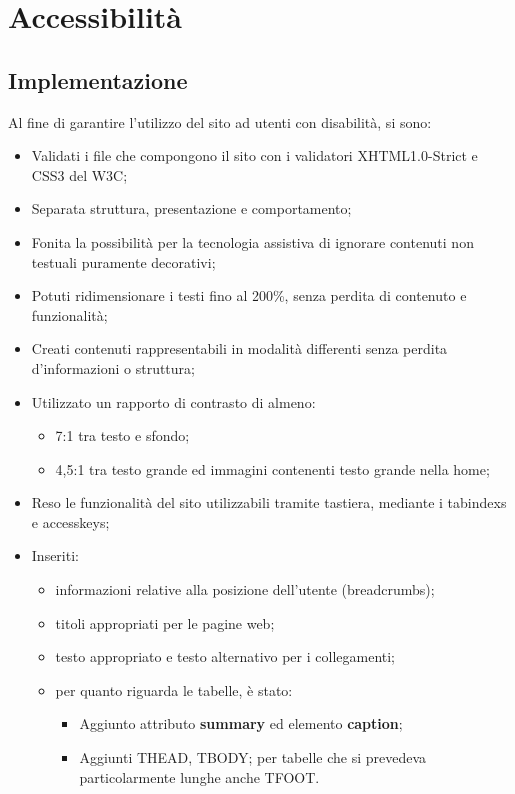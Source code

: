\section{Accessibilità}{
	\subsection{Implementazione}{
	Al fine di garantire l'utilizzo del sito ad utenti con disabilità, si sono:
	\begin{itemize}\itemsep0.5pt
		\item Validati i file che compongono il sito con i validatori XHTML1.0-Strict e CSS3 del W3C;
		\item Separata struttura, presentazione e comportamento;
		\item Fonita la possibilità per la tecnologia assistiva di ignorare contenuti non testuali puramente decorativi;
		\item Potuti ridimensionare i testi fino al 200\%, senza perdita di contenuto e funzionalità;
		\item Creati contenuti rappresentabili in modalità differenti senza perdita d'informazioni o struttura;
		\item Utilizzato un rapporto di contrasto di almeno: 
		\begin{itemize}\itemsep1pt
			\item 7:1 tra testo e sfondo;
			\item 4,5:1 tra testo grande ed immagini contenenti testo grande nella home;
		\end{itemize}
		\item Reso le funzionalità del sito utilizzabili tramite tastiera, mediante i tabindexs e accesskeys;
		\item Inseriti:
		\begin{itemize}\itemsep0.5pt
			\item informazioni relative alla posizione dell'utente (breadcrumbs); 
			\item titoli appropriati  per le pagine web; 
			\item testo appropriato e testo alternativo per i collegamenti;
			\item per quanto riguarda le tabelle, è stato:
				\begin{itemize} \itemsep0.5pt
					\item Aggiunto attributo \textbf{summary} ed elemento \textbf{caption};
					\item Aggiunti THEAD, TBODY; per tabelle che si prevedeva particolarmente lunghe anche TFOOT.

\end{itemize}
\end{itemize}
\end{itemize}}}
